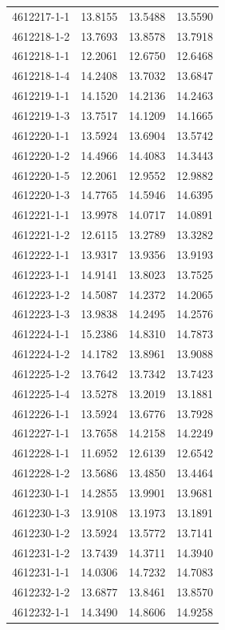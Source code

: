 \begin{longtable}{lrrr}
4612217-1-1 & 13.8155 & 13.5488 & 13.5590 \\
4612218-1-2 & 13.7693 & 13.8578 & 13.7918 \\
4612218-1-1 & 12.2061 & 12.6750 & 12.6468 \\
4612218-1-4 & 14.2408 & 13.7032 & 13.6847 \\
4612219-1-1 & 14.1520 & 14.2136 & 14.2463 \\
4612219-1-3 & 13.7517 & 14.1209 & 14.1665 \\
4612220-1-1 & 13.5924 & 13.6904 & 13.5742 \\
4612220-1-2 & 14.4966 & 14.4083 & 14.3443 \\
4612220-1-5 & 12.2061 & 12.9552 & 12.9882 \\
4612220-1-3 & 14.7765 & 14.5946 & 14.6395 \\
4612221-1-1 & 13.9978 & 14.0717 & 14.0891 \\
4612221-1-2 & 12.6115 & 13.2789 & 13.3282 \\
4612222-1-1 & 13.9317 & 13.9356 & 13.9193 \\
4612223-1-1 & 14.9141 & 13.8023 & 13.7525 \\
4612223-1-2 & 14.5087 & 14.2372 & 14.2065 \\
4612223-1-3 & 13.9838 & 14.2495 & 14.2576 \\
4612224-1-1 & 15.2386 & 14.8310 & 14.7873 \\
4612224-1-2 & 14.1782 & 13.8961 & 13.9088 \\
4612225-1-2 & 13.7642 & 13.7342 & 13.7423 \\
4612225-1-4 & 13.5278 & 13.2019 & 13.1881 \\
4612226-1-1 & 13.5924 & 13.6776 & 13.7928 \\
4612227-1-1 & 13.7658 & 14.2158 & 14.2249 \\
4612228-1-1 & 11.6952 & 12.6139 & 12.6542 \\
4612228-1-2 & 13.5686 & 13.4850 & 13.4464 \\
4612230-1-1 & 14.2855 & 13.9901 & 13.9681 \\
4612230-1-3 & 13.9108 & 13.1973 & 13.1891 \\
4612230-1-2 & 13.5924 & 13.5772 & 13.7141 \\
4612231-1-2 & 13.7439 & 14.3711 & 14.3940 \\
4612231-1-1 & 14.0306 & 14.7232 & 14.7083 \\
4612232-1-2 & 13.6877 & 13.8461 & 13.8570 \\
4612232-1-1 & 14.3490 & 14.8606 & 14.9258 \\

\end{longtable}
